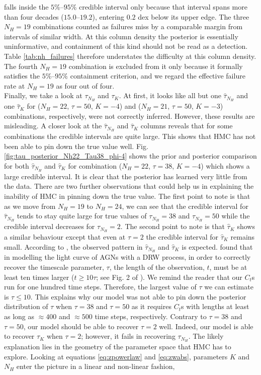 \documentclass{aa}
\begin{document}
falls inside the $5\%$--$95\%$ credible interval only because that interval spans more
than four decades ($15.0$--$19.2$), entering $0.2$ dex below its upper edge. The three
$N_H = 19$ combinations counted as failures miss by a comparable margin from intervals
of similar width. At this column density the posterior is essentially uninformative, and
containment of this kind should not be read as a detection. Table \ref{tab:nh_failures} therefore understates the difficulty at this column density. The fourth $N_H = 19$ combination is excluded from it only because it formally satisfies
the $5\%$--$95\%$ containment criterion, and we regard the effective failure rate at
$N_H = 19$ as four out of four. \\
Finally, we take a look at $\tau_{N_H}$ and $\tau_K$. At first, it looks like all but one $\hat\tau_{N_H}$ and one $\hat\tau_K$ for ($N_H = 22$, $\tau = 50$, $K = -4$) and ($N_H = 21$, $\tau = 50$, $K = -3$) combinations, respectively, were not correctly inferred. However, these results are misleading. A closer look at the $\hat\tau_{N_H}$ and $\hat\tau_K$ columns reveals that for some combinations the credible intervals are quite large. This shows that HMC has not been able to pin down the true value well. Fig. \ref{fig:tau_posterior_Nh22_Tau38_phi-4} shows the prior and posterior comparison for both $\hat\tau_{N_H}$ and $\hat\tau_K$ for combination ($N_H = 22$, $\tau = 38$, $K = -4$) which shows a large credible interval. It is clear that the posterior has learned very little from the data. There are two further observations that could help us in explaining the inability of HMC in pinning down the true value. The first point to note is that as we move from $N_H = 19$ to $N_H = 24$, we can see that the credible interval for $\hat\tau_{N_H}$ tends to stay quite large for true values of $\tau_{N_H} = 38$ and $\tau_{N_H} = 50$ while the credible interval decreases for $\tau_{N_H} = 2$. The second point to note is that $\hat\tau_K$ shows a similar behaviour except that even at $\tau = 2$ the credible interval for $\hat\tau_K$ remains small. According to \citet{Kozlowski2017}, the observed pattern in $\hat\tau_{N_H}$ and $\hat\tau_K$ is expected. \citet{Kozlowski2017} found that in modelling the light curve of AGNs with a DRW process, in order to correctly recover the timescale parameter, $\tau$, the length of the observation, $t$, must be at least ten times larger ($t \ge 10 \tau$; see Fig. 2 of \citealt{Kozlowski2017}). We remind the reader that our $C_t$s run for one hundred time steps. Therefore, the largest value of $\tau$ we can estimate is $\tau \le 10$. This explains why our model was not able to pin down the posterior distribution of $\tau$ when $\tau = 38$ and $\tau = 50$ as it requires $C_t$s with lengths at least as long as $\approx 400$ and $\approx 500$ time steps, respectively. Contrary to $\tau = 38$ and $\tau = 50$, our model should be able to recover $\tau = 2$ well. Indeed, our model is able to recover $\tau_K$ when $\tau = 2$; however, it fails in recovering $\tau_{N_H}$. The likely explanation lies in the geometry of the parameter space that HMC has to explore. Looking at equations \ref{eq:zpowerlaw} and \ref{eq:zwabs}, parameters $K$ and $N_H$ enter the picture in a linear and non-linear fashion, 
\end{document}
